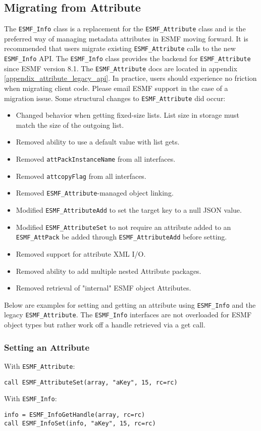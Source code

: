 \subsection{Migrating from Attribute}
The \texttt{ESMF\_Info} class is a replacement for the \texttt{ESMF\_Attribute} class and is the preferred way of managing metadata attributes in ESMF moving forward. It is recommended that users migrate existing \texttt{ESMF\_Attribute} calls to the new \texttt{ESMF\_Info} API. The \texttt{ESMF\_Info} class provides the backend for \texttt{ESMF\_Attribute} since ESMF version 8.1. The \texttt{ESMF\_Attribute} docs are located in appendix \ref{appendix_attribute_legacy_api}. In practice, users should experience no friction when migrating client code. Please email ESMF support in the case of a migration issue. Some structural changes to \texttt{ESMF\_Attribute} did occur:
\begin{itemize}
    \item Changed behavior when getting fixed-size lists. List size in storage must match the size of the outgoing list.
    \item Removed ability to use a default value with list gets.
    \item Removed \texttt{attPackInstanceName} from all interfaces.
    \item Removed \texttt{attcopyFlag} from all interfaces.
    \item Removed \texttt{ESMF\_Attribute}-managed object linking.
    \item Modified \texttt{ESMF\_AttributeAdd} to set the target key to a null JSON value.
    \item Modified \texttt{ESMF\_AttributeSet} to not require an attribute added to an \texttt{ESMF\_AttPack} be added through \texttt{ESMF\_AttributeAdd} before setting.
    \item Removed support for attribute XML I/O.
    \item Removed ability to add multiple nested Attribute packages.
    \item Removed retrieval of "internal" ESMF object Attributes.
\end{itemize}

Below are examples for setting and getting an attribute using \texttt{ESMF\_Info} and the legacy \texttt{ESMF\_Attribute}. The \texttt{ESMF\_Info} interfaces are not overloaded for ESMF object types but rather work off a handle retrieved via a get call.

\subsubsection{Setting an Attribute}
With \texttt{ESMF\_Attribute}:
\begin{verbatim}
call ESMF_AttributeSet(array, "aKey", 15, rc=rc)
\end{verbatim}
With \texttt{ESMF\_Info}:
\begin{verbatim}
info = ESMF_InfoGetHandle(array, rc=rc)
call ESMF_InfoSet(info, "aKey", 15, rc=rc)
\end{verbatim}

